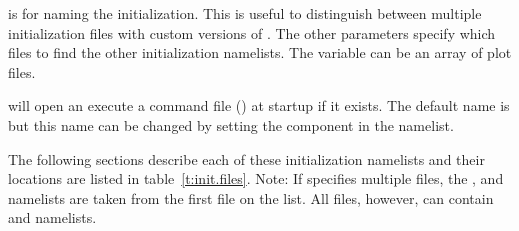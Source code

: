  is for naming the initialization. This is useful to distinguish between multiple
initialization files with custom versions of \tao. The other parameters specify which files to find
the other initialization namelists. The  variable can be an array of plot files.

\tao will open an execute a command file () at startup if it exists.  The
default name is  but this name can be changed by setting the 
component in the  namelist.

The following sections describe each of these initialization namelists and their locations are
listed in table~\ref{t:init.files}. Note: If  specifies multiple files, the
,  and  namelists are taken from the
first file on the list. All files, however, can contain  and
 namelists.


